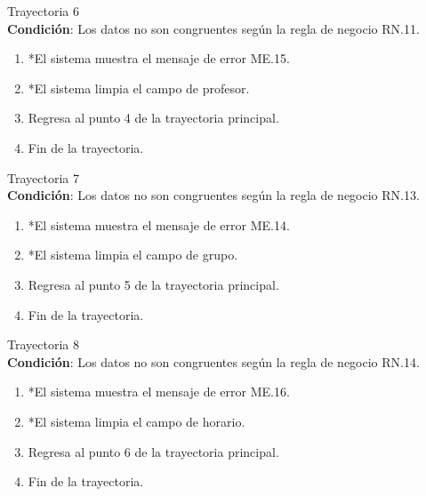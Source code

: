 \large{Trayectoria 6}\\
\textbf{Condición}: Los datos no son congruentes según la regla de negocio RN.11.
\begin{enumerate}
    \item *El sistema muestra el mensaje de error ME.15.
    \item *El sistema limpia el campo de profesor.
    \item Regresa al punto 4 de la trayectoria principal.
    \item Fin de la trayectoria.
\end{enumerate}
\large{Trayectoria 7}\\
\textbf{Condición}: Los datos no son congruentes según la regla de negocio RN.13.
\begin{enumerate}
    \item *El sistema muestra el mensaje de error ME.14.
    \item *El sistema limpia el campo de grupo.
    \item Regresa al punto 5 de la trayectoria principal.
    \item Fin de la trayectoria.
\end{enumerate}
\large{Trayectoria 8}\\
\textbf{Condición}: Los datos no son congruentes según la regla de negocio RN.14.
\begin{enumerate}
    \item *El sistema muestra el mensaje de error ME.16.
    \item *El sistema limpia el campo de horario.
    \item Regresa al punto 6 de la trayectoria principal.
    \item Fin de la trayectoria.
\end{enumerate}